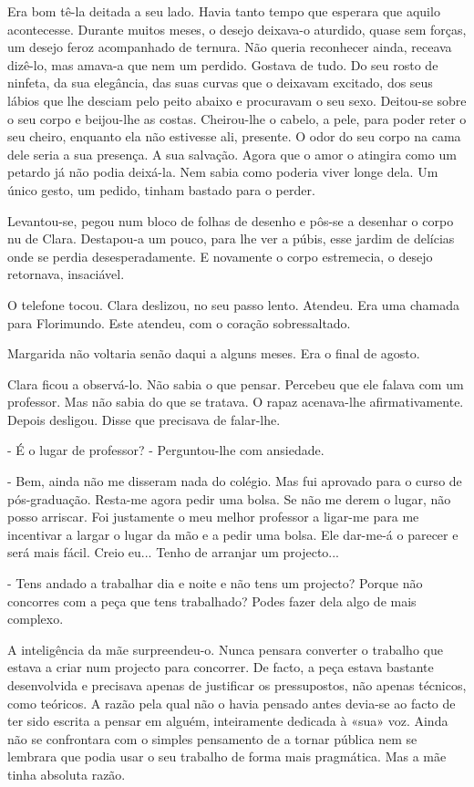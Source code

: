 Era bom tê-la deitada a seu lado. Havia tanto tempo que esperara que
aquilo acontecesse. Durante muitos meses, o desejo deixava-o aturdido,
quase sem forças, um desejo feroz acompanhado de ternura. Não queria
reconhecer ainda, receava dizê-lo, mas amava-a que nem um perdido.
Gostava de tudo. Do seu rosto de ninfeta, da sua elegância, das suas
curvas que o deixavam excitado, dos seus lábios que lhe desciam pelo
peito abaixo e procuravam o seu sexo. Deitou-se sobre o seu corpo e
beijou-lhe as costas. Cheirou-lhe o cabelo, a pele, para poder reter o
seu cheiro, enquanto ela não estivesse ali, presente. O odor do seu
corpo na cama dele seria a sua presença. A sua salvação. Agora que o
amor o atingira como um petardo já não podia deixá-la. Nem sabia como
poderia viver longe dela. Um único gesto, um pedido, tinham bastado para
o perder.

Levantou-se, pegou num bloco de folhas de desenho e pôs-se a desenhar o
corpo nu de Clara. Destapou-a um pouco, para lhe ver a púbis, esse
jardim de delícias onde se perdia desesperadamente. E novamente o corpo
estremecia, o desejo retornava, insaciável.

O telefone tocou. Clara deslizou, no seu passo lento. Atendeu. Era uma
chamada para Florimundo. Este atendeu, com o coração sobressaltado.

Margarida não voltaria senão daqui a alguns meses. Era o final de
agosto.

Clara ficou a observá-lo. Não sabia o que pensar. Percebeu que ele
falava com um professor. Mas não sabia do que se tratava. O rapaz
acenava-lhe afirmativamente. Depois desligou. Disse que precisava de
falar-lhe.

- É o lugar de professor? - Perguntou-lhe com ansiedade.

- Bem, ainda não me disseram nada do colégio. Mas fui aprovado para o
curso de pós-graduação. Resta-me agora pedir uma bolsa. Se não me derem
o lugar, não posso arriscar. Foi justamente o meu melhor professor a
ligar-me para me incentivar a largar o lugar da mão e a pedir uma bolsa.
Ele dar-me-á o parecer e será mais fácil. Creio eu... Tenho de arranjar
um projecto...

- Tens andado a trabalhar dia e noite e não tens um projecto? Porque não
concorres com a peça que tens trabalhado? Podes fazer dela algo de mais
complexo.

A inteligência da mãe surpreendeu-o. Nunca pensara converter o trabalho
que estava a criar num projecto para concorrer. De facto, a peça estava
bastante desenvolvida e precisava apenas de justificar os pressupostos,
não apenas técnicos, como teóricos. A razão pela qual não o havia
pensado antes devia-se ao facto de ter sido escrita a pensar em alguém,
inteiramente dedicada à «sua» voz. Ainda não se confrontara com o
simples pensamento de a tornar pública nem se lembrara que podia usar o
seu trabalho de forma mais pragmática. Mas a mãe tinha absoluta razão.

